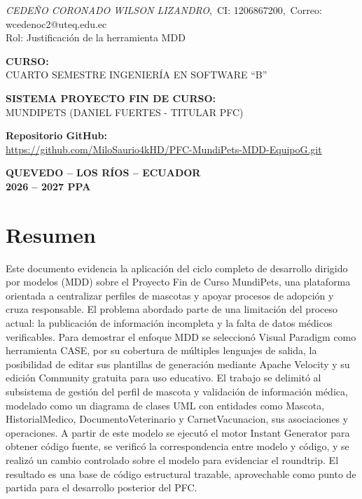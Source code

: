 \documentclass[journal,onecolumn]{IEEEtran}
\begin{document}
\begin{titlepage}
		\vspace{0.5cm}
		
		\textit{CEDEÑO CORONADO WILSON LIZANDRO},~CI: 1206867200,~Correo: wcedenoc2@uteq.edu.ec\\
		{\small Rol: Justificación de la herramienta MDD}
		
		\vspace{0.5cm}
		
		{\normalsize\bfseries CURSO:}\\[4pt]
		{\normalsize CUARTO SEMESTRE INGENIERÍA EN SOFTWARE \enquote{B}}
		
		\vspace{1cm}
		
		{\normalsize\bfseries SISTEMA PROYECTO FIN DE CURSO:}\\[4pt]
		{\normalsize MUNDIPETS (DANIEL FUERTES - TITULAR PFC)}\\[4pt]
		\vspace{0.5cm}
		
		
		\quad\textbf{Repositorio GitHub:}\\
		\url{https://github.com/MiloSaurio4kHD/PFC-MundiPets-MDD-EquipoG.git}
		
		\vspace{0.5cm}
		
		{\normalsize\bfseries QUEVEDO -- LOS RÍOS -- ECUADOR}\\[4pt]
		{\normalsize\bfseries 2026 -- 2027 PPA}
		
	\end{titlepage}
	
	\tableofcontents
	\newpage
	\listoffigures
	\listoftables
	\lstlistoflistings
	\newpage
	\section{Resumen}
	
	Este documento evidencia la aplicación del ciclo completo de desarrollo dirigido por modelos (MDD) sobre el Proyecto Fin de Curso MundiPets, una plataforma orientada a centralizar perfiles de mascotas y apoyar procesos de adopción y cruza responsable. El problema abordado parte de una limitación del proceso actual: la publicación de información incompleta y la falta de datos médicos verificables. Para demostrar el enfoque MDD se seleccionó Visual Paradigm como herramienta CASE, por su cobertura de múltiples lenguajes de salida, la posibilidad de editar sus plantillas de generación mediante Apache Velocity y su edición Community gratuita para uso educativo. El trabajo se delimitó al subsistema de gestión del perfil de mascota y validación de información médica, modelado como un diagrama de clases UML con entidades como Mascota, HistorialMedico, DocumentoVeterinario y CarnetVacunacion, sus asociaciones y operaciones. A partir de este modelo se ejecutó el motor Instant Generator para obtener código fuente, se verificó la correspondencia entre modelo y código, y se realizó un cambio controlado sobre el modelo para evidenciar el roundtrip. El resultado es una base de código estructural trazable, aprovechable como punto de partida para el desarrollo posterior del PFC.
	
\end{document}
